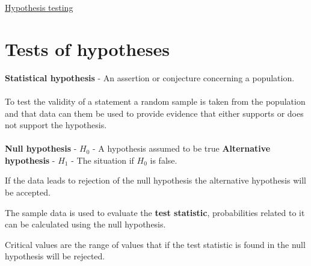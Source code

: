 \documentclass{article}[18pt]
\begin{document}
\begin{center}
\underline{\huge Hypothesis testing}
\end{center}
\section{Tests of hypotheses}
\textbf{Statistical hypothesis} - An assertion or conjecture concerning a population.\\
\\
To test the validity of a statement a random sample is taken from the population and that data can them be used to provide evidence that either supports or does not support the hypothesis.\\
\\
\textbf{Null hypothesis} - $H_0$ - A hypothesis assumed to be true
\textbf{Alternative hypothesis} - $H_1$ - The situation if $H_0$ is false.

If the data leads to rejection of the null hypothesis the alternative hypothesis will be accepted.

The sample data is used to evaluate the \textbf{test statistic}, probabilities related to it can be calculated using the null hypothesis.

Critical values are the range of values that if the test statistic is found in the null hypothesis will be rejected.


 
\end{document}

